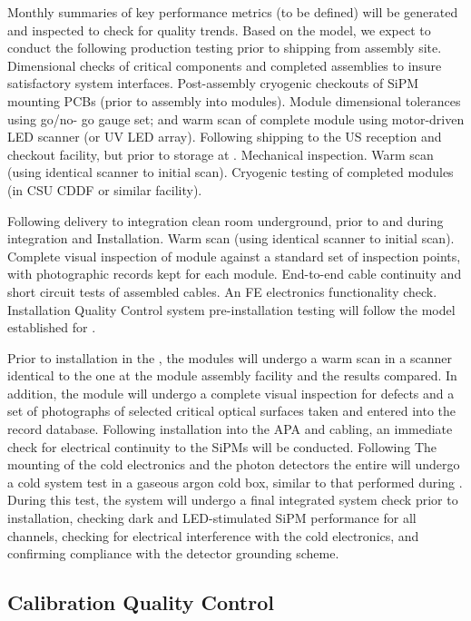 Monthly summaries of key performance metrics (to be defined) will be
generated and inspected to check for quality trends. Based on the
 model, we expect to conduct the following production
testing prior to shipping from assembly site. Dimensional checks of
critical components and completed assemblies to insure satisfactory
system interfaces. Post-assembly cryogenic checkouts of SiPM mounting
PCBs (prior to assembly into  modules). Module dimensional
tolerances using go/no- go gauge set; and warm scan of complete module
using motor-driven LED scanner (or UV LED array).  Following shipping
to the US reception and checkout facility, but prior to storage at
. Mechanical inspection. Warm scan (using identical scanner to
initial scan). Cryogenic testing of completed modules (in CSU CDDF or
similar facility).

Following delivery to integration clean room underground, prior to and
during integration and Installation. Warm scan (using identical
scanner to initial scan). Complete visual inspection of module against
a standard set of inspection points, with photographic records kept
for each module. End-to-end cable continuity and short circuit tests
of assembled cables. An FE electronics functionality
check. Installation Quality Control  system pre-installation testing
will follow the model established for .

Prior to installation in the , the  modules will undergo a warm
scan in a scanner identical to the one at the  module assembly
facility and the results compared. In addition, the module will
undergo a complete visual inspection for defects and a set of
photographs of selected critical optical surfaces taken and entered
into the  record database. Following installation into the APA and
cabling, an immediate check for electrical continuity to the SiPMs
will be conducted. Following The mounting of the  cold electronics
and the photon detectors the entire  will undergo a cold system
test in a gaseous argon cold box, similar to that performed during
. During this test, the  system will undergo a final
integrated system check prior to installation, checking dark and
LED-stimulated SiPM performance for all channels, checking for
electrical interference with the cold electronics, and confirming
compliance with the detector grounding scheme.

\subsection{Calibration Quality Control}


